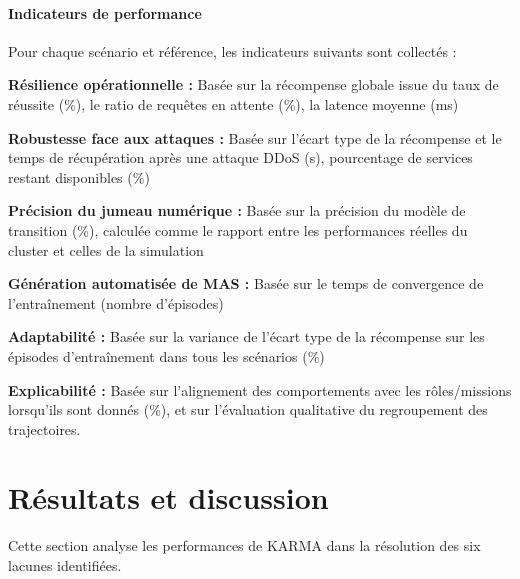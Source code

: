 \paragraph{\textbf{Indicateurs de performance}}

\noindent Pour chaque scénario et référence, les indicateurs suivants sont collectés :
%
\begin{enumerate*}[label=\textbf{\arabic*)}, itemjoin={;\quad }]
    \item \textbf{Résilience opérationnelle :} Basée sur la récompense globale issue du taux de réussite (\%), le ratio de requêtes en attente (\%), la latence moyenne (ms)
    \item \textbf{Robustesse face aux attaques :} Basée sur l'écart type de la récompense et le temps de récupération après une attaque DDoS (s), pourcentage de services restant disponibles (\%)
    \item \textbf{Précision du jumeau numérique :} Basée sur la précision du modèle de transition (\%), calculée comme le rapport entre les performances réelles du cluster et celles de la simulation
    \item \textbf{Génération automatisée de MAS :} Basée sur le temps de convergence de l'entraînement (nombre d'épisodes)
    \item \textbf{Adaptabilité :} Basée sur la variance de l'écart type de la récompense sur les épisodes d'entraînement dans tous les scénarios (\%)
    \item \textbf{Explicabilité :} Basée sur l'alignement des comportements avec les rôles/missions lorsqu'ils sont donnés (\%), et sur l'évaluation qualitative du regroupement des trajectoires.
\end{enumerate*}



\section{Résultats et discussion}
\label{sec:results}

Cette section analyse les performances de KARMA dans la résolution des six lacunes identifiées.


